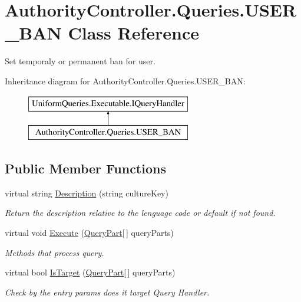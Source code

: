 \hypertarget{class_authority_controller_1_1_queries_1_1_u_s_e_r___b_a_n}{}\section{Authority\+Controller.\+Queries.\+U\+S\+E\+R\+\_\+\+B\+AN Class Reference}
\label{class_authority_controller_1_1_queries_1_1_u_s_e_r___b_a_n}


Set temporaly or permanent ban for user.  


Inheritance diagram for Authority\+Controller.\+Queries.\+U\+S\+E\+R\+\_\+\+B\+AN\+:\begin{figure}[H]
\begin{center}
\leavevmode
\includegraphics[height=2.000000cm]{d3/d4f/class_authority_controller_1_1_queries_1_1_u_s_e_r___b_a_n}
\end{center}
\end{figure}
\subsection*{Public Member Functions}
\begin{DoxyCompactItemize}
\item 
virtual string \mbox{\hyperlink{class_authority_controller_1_1_queries_1_1_u_s_e_r___b_a_n_ae0fe5998c22cf9fb76b601fbf7ee832e}{Description}} (string culture\+Key)
\begin{DoxyCompactList}\small\item\em Return the description relative to the lenguage code or default if not found. \end{DoxyCompactList}\item 
virtual void \mbox{\hyperlink{class_authority_controller_1_1_queries_1_1_u_s_e_r___b_a_n_a160a12bc99edf855a2bdddb908596ecf}{Execute}} (\mbox{\hyperlink{struct_uniform_queries_1_1_query_part}{Query\+Part}}\mbox{[}$\,$\mbox{]} query\+Parts)
\begin{DoxyCompactList}\small\item\em Methods that process query. \end{DoxyCompactList}\item 
virtual bool \mbox{\hyperlink{class_authority_controller_1_1_queries_1_1_u_s_e_r___b_a_n_a4f42625ac06de3292575a043ff0addd9}{Is\+Target}} (\mbox{\hyperlink{struct_uniform_queries_1_1_query_part}{Query\+Part}}\mbox{[}$\,$\mbox{]} query\+Parts)
\begin{DoxyCompactList}\small\item\em Check by the entry params does it target Query Handler. \end{DoxyCompactList}\end{DoxyCompactItemize}


